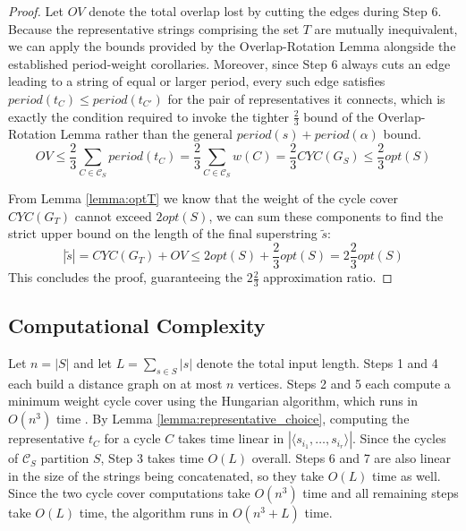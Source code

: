 \begin{proof}Let $OV$ denote the total overlap lost by cutting the edges during Step 6. Because the representative strings comprising the set $T$ are mutually inequivalent, we can apply the bounds provided by the Overlap-Rotation Lemma alongside the established period-weight corollaries. Moreover, since Step 6 always cuts an edge leading to a string of equal or larger period, every such edge satisfies $\textit{period}(t_{C}) \le \textit{period}(t_{C'})$ for the pair of representatives it connects, which is exactly the condition required to invoke the tighter $\frac{2}{3}$ bound of the Overlap-Rotation Lemma rather than the general $period(s) + period(\alpha)$ bound.
\begin{equation}
OV \le \frac{2}{3} \sum_{C \in \mathcal{C}_S} \textit{period}(t_C) = \frac{2}{3} \sum_{C \in \mathcal{C}_S} w(C) = \frac{2}{3} CYC(G_S) \le \frac{2}{3} opt(S)
\end{equation}

From Lemma \ref{lemma:optT} we know that the weight of the cycle cover
$CYC(G_T)$ cannot exceed $2opt(S)$, we can sum these components to find the
strict upper bound on the length of the final superstring $\tilde{s}$:
\begin{equation}
|\tilde{s}| = CYC(G_T) + OV \le 2opt(S) + \frac{2}{3}opt(S) = 2\frac{2}{3}opt(S)
\end{equation}
This concludes the proof, guaranteeing the $2\frac{2}{3}$ approximation ratio.
\end{proof}

\subsection{Computational Complexity}
Let $n = |S|$ and let $L = \sum_{s \in S} |s|$ denote the total input length.
Steps 1 and 4 each build a distance graph on at most $n$ vertices. Steps 2 and 5
each compute a minimum weight cycle cover using the Hungarian algorithm, which
runs in $O(n^3)$ time \cite{kuhn1955hungarian, edmondskarp1972, tomizawa1971techniques}. By Lemma
\ref{lemma:representative_choice}, computing the representative $t_C$ for a
cycle $C$ takes time linear in $|\langle s_{i_1}, \dots, s_{i_r} \rangle|$.
Since the cycles of $\mathcal{C}_S$ partition $S$, Step 3 takes time $O(L)$
overall. Steps 6 and 7 are also linear in the size of the strings being
concatenated, so they take $O(L)$ time as well. Since the two cycle cover
computations take $O(n^3)$ time and all remaining steps take $O(L)$ time, the
algorithm runs in $O(n^3 + L)$ time.
